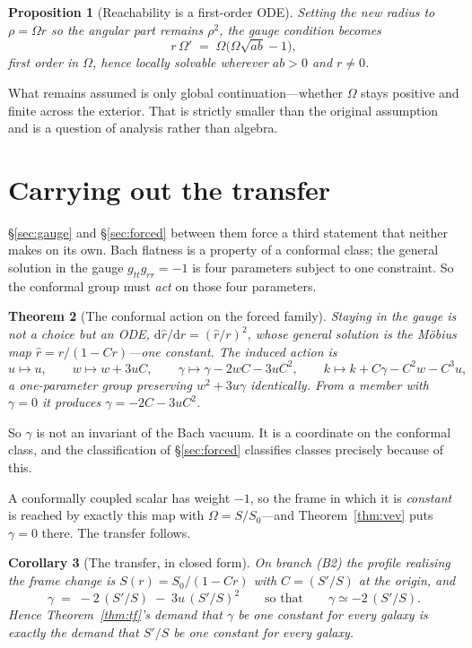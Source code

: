 \documentclass[11pt]{article}
\newtheorem{theorem}{Theorem}[section]
\newtheorem{proposition}[theorem]{Proposition}
\newtheorem{corollary}[theorem]{Corollary}
\theoremstyle{definition}
\theoremstyle{remark}
\newcommand{\dd}{\mathrm d}
\begin{document}
\begin{proposition}[Reachability is a first-order ODE]
Setting the new radius to \(\rho=\Omega r\) so the angular part remains
\(\rho^{2}\), the gauge condition becomes
\[
  r\,\Omega' \;=\; \Omega\bigl(\Omega\sqrt{ab}-1\bigr),
\]
first order in \(\Omega\), hence locally solvable wherever \(ab>0\) and
\(r\neq0\).
\end{proposition}

What remains assumed is only global continuation---whether \(\Omega\) stays
positive and finite across the exterior.  That is strictly smaller than the
original assumption and is a question of analysis rather than algebra.

\section{Carrying out the transfer}
\label{sec:transfer}

\S\ref{sec:gauge} and \S\ref{sec:forced} between them force a third statement
that neither makes on its own.  Bach flatness is a property of a conformal
class; the general solution in the gauge \(g_{tt}g_{rr}=-1\) is four
parameters subject to one constraint.  So the conformal group must \emph{act}
on those four parameters.

\begin{theorem}[The conformal action on the forced family]
\label{thm:action}
Staying in the gauge is not a choice but an ODE, \(\dd\hat r/\dd r=(\hat
r/r)^{2}\), whose general solution is the M\"obius map \(\hat
r=r/(1-Cr)\)---one constant.  The induced action is
\[
  u\mapsto u,\qquad
  w\mapsto w+3uC,\qquad
  \gamma\mapsto\gamma-2wC-3uC^{2},\qquad
  k\mapsto k+C\gamma-C^{2}w-C^{3}u,
\]
a one-parameter group preserving \(w^{2}+3u\gamma\) identically.  From a
member with \(\gamma=0\) it produces \(\gamma=-2C-3uC^{2}\).
\end{theorem}

So \(\gamma\) is not an invariant of the Bach vacuum.  It is a coordinate on
the conformal class, and the classification of \S\ref{sec:forced} classifies
classes precisely because of this.

A conformally coupled scalar has weight \(-1\), so the frame in which it is
\emph{constant} is reached by exactly this map with \(\Omega=S/S_{0}\)---and
Theorem~\ref{thm:vev} puts \(\gamma=0\) there.  The transfer follows.

\begin{corollary}[The transfer, in closed form]
\label{cor:transfer}
On branch (B2) the profile realising the frame change is
\(S(r)=S_{0}/(1-Cr)\) with \(C=(S'/S)\) at the origin, and
\[
  \gamma \;=\; -2\,(S'/S)\;-\;3u\,(S'/S)^{2}
  \qquad\text{so that}\qquad \gamma\simeq-2\,(S'/S).
\]
Hence Theorem~\ref{thm:tf}'s demand that \(\gamma\) be one constant for every
galaxy is exactly the demand that \(S'/S\) be one constant for every galaxy.
\end{corollary}
\end{document}
